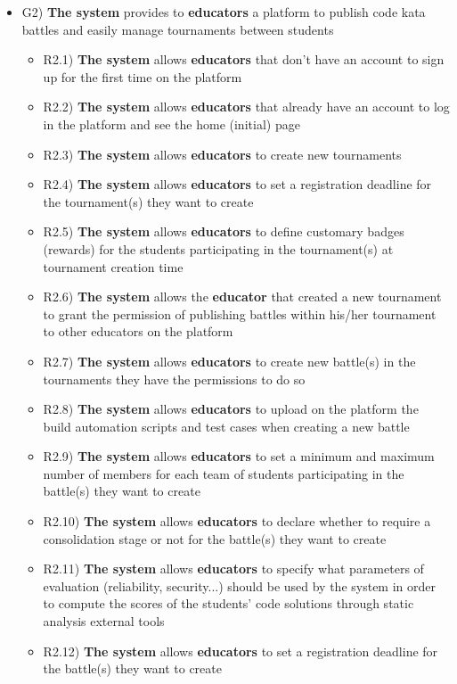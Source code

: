 	
	\begin{itemize}
		\item G2) \textbf{The system} provides to \textbf{educators} a platform to publish code kata battles and easily manage tournaments between students
		\begin{itemize}
			\item R2.1) \textbf{The system} allows \textbf{educators} that don’t have an account to sign up for the first time on the platform
			\item R2.2) \textbf{The system} allows \textbf{educators} that already have an account to log in the platform and see the home (initial) page
			\item R2.3) \textbf{The system} allows \textbf{educators} to create new tournaments
			\item R2.4) \textbf{The system} allows \textbf{educators} to set a registration deadline for the tournament(s) they want to create
			\item R2.5) \textbf{The system} allows \textbf{educators} to define customary badges (rewards) for the students participating in the tournament(s) at tournament creation time
			\item R2.6) \textbf{The system} allows the \textbf{educator} that created a new tournament to grant the permission of publishing battles within his/her tournament to other educators on the platform
			\item R2.7) \textbf{The system} allows \textbf{educators} to create new battle(s) in the tournaments they have the permissions to do so
			\item R2.8) \textbf{The system} allows \textbf{educators} to upload on the platform the build automation scripts and test cases when creating a new battle
			\item R2.9) \textbf{The system} allows \textbf{educators} to set a minimum and maximum number of members for each team of students participating in the battle(s) they want to create
			\item R2.10) \textbf{The system} allows \textbf{educators} to declare whether to require a consolidation stage or not for the battle(s) they want to create
			\item R2.11) \textbf{The system} allows \textbf{educators} to specify what parameters of evaluation (reliability, security...) should be used by the system in order to compute the scores of the students' code solutions through static analysis external tools
			\item R2.12) \textbf{The system} allows \textbf{educators} to set a registration deadline for the battle(s) they want to create

\end{itemize}
\end{itemize}
